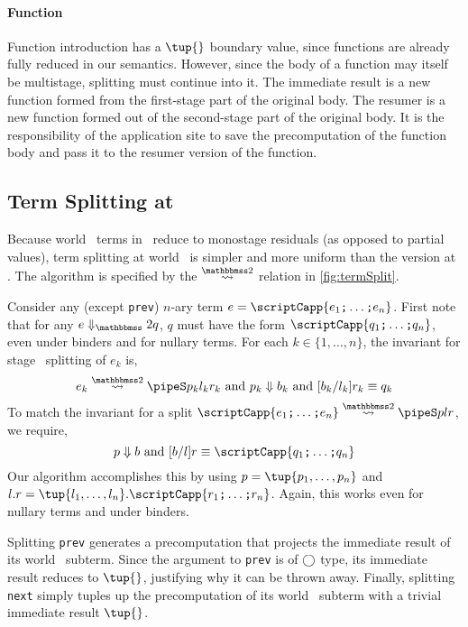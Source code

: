 \begin{abstrsyn}
\paragraph {Function} 
Function introduction has a $\tup{}$ boundary value,
since functions are already fully reduced in our semantics.
However, since the body of a function may itself be multistage, splitting must continue into it.
The immediate result is a new function formed from the first-stage part of the original body.
The resumer is a new function formed out of the second-stage part of the original body.
It is the responsibility of the application site to save the precomputation of the function body
and pass it to the resumer version of the function.

\subsection{Term Splitting at \bbtwo}

Because world \bbtwo\ terms in \lang\ reduce to monostage residuals (as opposed to partial values),
term splitting at world \bbtwo\ is simpler and more uniform than the version at \bbonem. 
The algorithm is specified by the $\splittwosym$ relation in \cref{fig:termSplit}.

Consider any (except \texttt{prev}) 
$n$-ary term $e = \scriptCapp {e_1 \ttsemi \ldots \ttsemi e_n}$.
First note that for any $\diatwo e q$, $q$ must have the form $\scriptCapp {q_1 \ttsemi \ldots \ttsemi q_n}$,
even under binders and for nullary terms.
For each $k \in \{1,\ldots,n\}$, the invariant for stage \bbtwo\ splitting of $e_k$ is,
\[
	\splittwo {e_k} A {p_k} {l_k} {r_k} \text{ and } \reduce {p_k} {b_k} \text{ and } [{b_k}/{l_k}]{r_k} \equiv {q_k}
\]
To match the invariant for a split $\splittwo {\scriptCapp {e_1 \ttsemi \ldots \ttsemi e_n}} A p l r$, we require,
\[
	\reduce p b \text{ and } [b/l]r \equiv \scriptCapp {q_1 \ttsemi \ldots \ttsemi q_n}
\]
Our algorithm accomplishes this by using $p = \tup {p_1, \ldots, p_n}$ and
$l.r = \tup {l_1, \ldots, l_n}.\scriptCapp {r_1 \ttsemi \ldots \ttsemi r_n}$.
Again, this works even for nullary terms and under binders.

Splitting \texttt{prev} generates a precomputation that projects the immediate
result of its world \bbone\ subterm.
Since the argument to \texttt{prev} is of $\bigcirc$ type, its immediate result reduces to $\tup{}$, justifying why it can be thrown away.
Finally, splitting \texttt{next} simply tuples up the precomputation of its
world \bbtwo\ subterm with a trivial immediate result $\tup{}$.


\end{abstrsyn}
